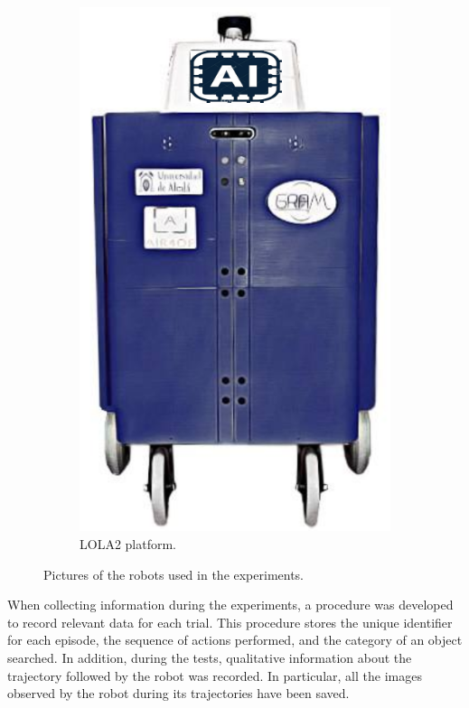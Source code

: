 \begin{figure}
\begin{subfigure}[b]{0.4\textwidth}
        \includegraphics[width=\textwidth]{figures/ros4vsn/lola2}
        \caption{LOLA2 platform.}
        \label{fig:robot_lola}
    \end{subfigure}
    \caption{Pictures of the robots used in the experiments.}\label{fig:robots}
\end{figure}

When collecting information during the experiments, a procedure was developed to record relevant data for each trial.
This procedure stores the unique identifier for each episode, the sequence of actions performed, and the category of an object searched.
In addition, during the tests, qualitative information about the trajectory followed by the robot was recorded.
In particular, all the images observed by the robot during its trajectories have been saved.


